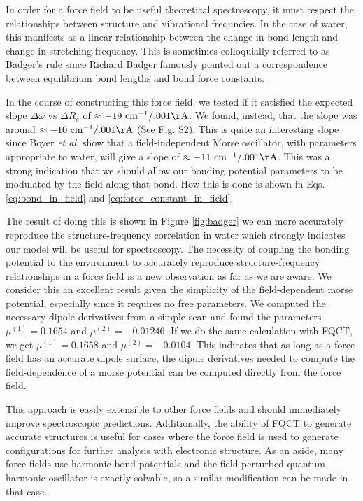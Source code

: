 \documentclass[journal=jacsat,manuscript=article]{achemso}
\begin{document}
In order for a force field to be useful theoretical spectroscopy, it must respect the relationships
between structure and vibrational frequncies. In the case of water, this manifests as a linear
relationship between the change in bond length and change in  stretching frequency.\cite{boyer2019beyond}
This is sometimes colloquially referred to as Badger's rule since Richard Badger famously pointed out a
correspondence between equilibrium bond lengths and bond force constants.\cite{badger1934relation}

In the course of constructing this force field, we tested if it satisfied the expected slope
$\Delta\omega$ vs $\Delta R_e$ of $\approx -19\ \mathrm{cm^{-1}/.001\AA}$\cite{boyer2019beyond}.
We found, instead, that the slope was around $\approx -10\ \mathrm{cm^{-1}/.001\AA}$ (See Fig. S2).
This is quite an interesting slope since Boyer \textit{et al.} show that a field-independent Morse
oscillator, with parameters appropriate to water, will give a slope of $\approx -11\ \mathrm{cm^{-1}/.001\AA}$.
This was a strong indication that we should allow our bonding potential parameters to be modulated
by the field along that bond. How this is done is shown in Eqs. \ref{eq:bond_in_field} and \ref{eq:force_constant_in_field}.

The result of doing this is shown in Figure \ref{fig:badger} we can more accurately reproduce the structure-frequency correlation
in water which strongly indicates our model will be useful for spectroscopy. The necessity
of coupling the bonding potential to the environment to accurately reproduce structure-frequency
relationships in a force field is a new observation as far as we are aware. We consider this an
excellent result given the simplicity of the field-dependent morse potential, especially since it
requires no free parameters. We computed the necessary dipole derivatives from a simple  scan
and found the parameters $\mu^{(1)}=0.1654$ and $\mu^{(2)}=-0.01246$. If we do the same
calculation with FQCT, we get $\mu^{(1)}=0.1658$ and $\mu^{(2)}=-0.0104$. This indicates that as
long as a force field has an accurate dipole surface, the dipole derivatives needed to compute
the field-dependence of a morse potential can be computed directly from the force field.

This approach is easily extensible to other force fields and should immediately improve spectroscopic predictions.
Additionally, the ability of FQCT to generate accurate structures is useful for cases
where the force field is used to generate configurations for further analysis with electronic structure.
As an aside, many force fields use harmonic bond potentials and the field-perturbed quantum harmonic oscillator
is exactly solvable, so a similar modification can be made in that case.
\end{document}

